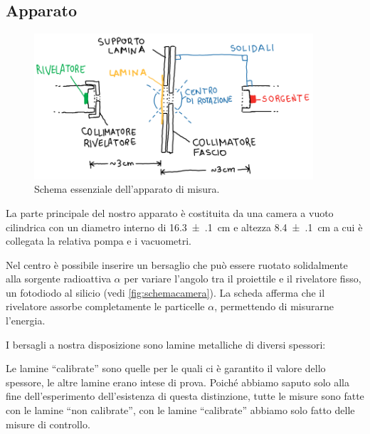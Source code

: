 \subsection{Apparato}

\begin{figure}
	\centering
	\includegraphics[width=28em]{immagini/schemacamera}
	\caption{\label{fig:schemacamera}
	Schema essenziale dell'apparato di misura.}
\end{figure}

La parte principale del nostro apparato è costituita da una camera a vuoto cilindrica con un diametro interno di  \SI{16.3(1)}{cm} e altezza \SI{8.4(1)}{cm} a cui è collegata la relativa pompa e i vacuometri.

Nel centro è possibile inserire un bersaglio che può essere ruotato solidalmente alla sorgente radioattiva $\alpha$
per variare l'angolo tra il proiettile e il rivelatore fisso, un fotodiodo al silicio (vedi \autoref{fig:schemacamera}).
La scheda afferma che il rivelatore assorbe completamente le particelle $\alpha$,
permettendo di misurarne l'energia.

I bersagli a nostra disposizione sono lamine metalliche di diversi spessori:
Le lamine ``calibrate'' sono quelle per le quali ci è garantito il valore dello spessore,
le altre lamine erano intese di prova.
Poiché abbiamo saputo solo alla fine dell'esperimento dell'esistenza di questa distinzione,
tutte le misure sono fatte con le lamine ``non calibrate'',
con le lamine ``calibrate'' abbiamo solo fatto delle misure di controllo.

